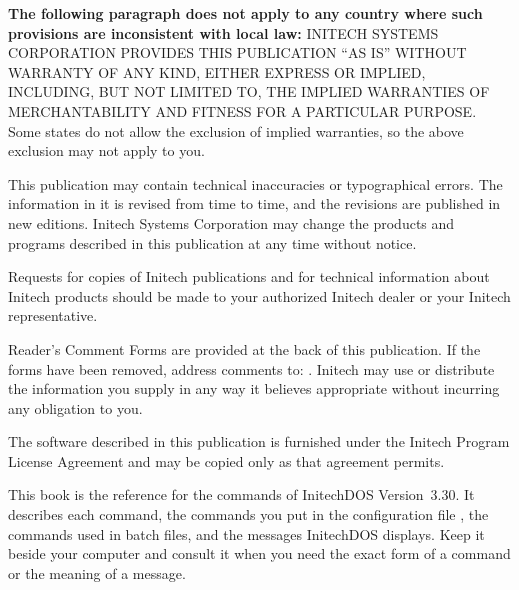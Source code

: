 \begin{TitleVerso}
{\imLegalFont
\textbf{The following paragraph does not apply to any country where such
provisions are inconsistent with local law:} INITECH SYSTEMS CORPORATION
PROVIDES THIS PUBLICATION ``AS IS'' WITHOUT WARRANTY OF ANY KIND, EITHER
EXPRESS OR IMPLIED, INCLUDING, BUT NOT LIMITED TO, THE IMPLIED WARRANTIES OF
MERCHANTABILITY AND FITNESS FOR A PARTICULAR PURPOSE.  Some states do not
allow the exclusion of implied warranties, so the above exclusion may not
apply to you.\par
This publication may contain technical inaccuracies or typographical errors.
The information in it is revised from time to time, and the revisions are
published in new editions.  Initech Systems Corporation may change the
products and programs described in this publication at any time without
notice.\par
Requests for copies of Initech publications and for technical information
about Initech products should be made to your authorized Initech dealer or
your Initech representative.\par}

{\footnotesize
Reader's Comment Forms are provided at the back of this publication.  If the
forms have been removed, address comments to: \InitechAddressLine.
Initech may use or distribute the information you supply in any way it
believes appropriate without incurring any obligation to you.\par
The software described in this publication is furnished under the Initech
Program License Agreement and may be copied only as that agreement
permits.\par}
\end{TitleVerso}

This book is the reference for the commands of InitechDOS Version~3.30.  It
describes each command, the commands you put in the configuration file
, the commands used in batch files, and the messages
InitechDOS displays.  Keep it beside your computer and consult it when you
need the exact form of a command or the meaning of a message.

